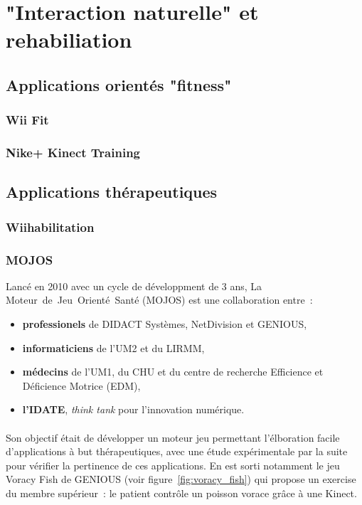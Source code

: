 
\section{"Interaction naturelle" et rehabiliation}
  
\subsection{Applications orientés "fitness"}

\subsubsection{Wii Fit}

\subsubsection{Nike+ Kinect Training}



\subsection{Applications thérapeutiques}

\subsubsection{Wiihabilitation}

\subsubsection{MOJOS}
Lancé en 2010 avec un cycle de développment de 3 ans, 
La Moteur~de~Jeu~Orienté~Santé (MOJOS) est une collaboration entre~:
\begin{itemize}
\item \textbf{professionels} de DIDACT Systèmes, NetDivision et GENIOUS,
\item \textbf{informaticiens} de l'UM2 et du LIRMM,
\item \textbf{médecins} de l'UM1, du CHU et du centre 
de recherche Efficience et Déficience Motrice (EDM),
\item \textbf{l'IDATE}, \emph{think tank} pour l'innovation numérique.
\end{itemize}

\paragraph{}
Son objectif était de développer un moteur jeu permettant 
l'élboration facile d'applications à but thérapeutiques, avec une étude 
expérimentale
par la suite pour vérifier la pertinence de ces applications. En est sorti 
notamment le jeu Voracy Fish de GENIOUS (voir figure~\ref{fig:voracy_fish})
qui propose un exercise du membre supérieur~: le patient contrôle un poisson 
vorace grâce à une Kinect.

